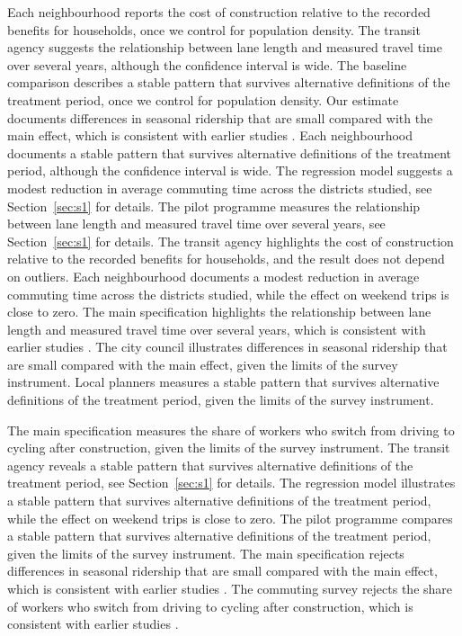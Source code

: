 \documentclass[11pt]{article}
\begin{document}
Each neighbourhood reports the cost of construction relative to the recorded benefits for households, once we control for population density. The transit agency suggests the relationship between lane length and measured travel time over several years, although the confidence interval is wide. The baseline comparison describes a stable pattern that survives alternative definitions of the treatment period, once we control for population density. Our estimate documents differences in seasonal ridership that are small compared with the main effect, which is consistent with earlier studies \citep{lane2019}. Each neighbourhood documents a stable pattern that survives alternative definitions of the treatment period, although the confidence interval is wide. The regression model suggests a modest reduction in average commuting time across the districts studied, see Section~\ref{sec:s1} for details. The pilot programme measures the relationship between lane length and measured travel time over several years, see Section~\ref{sec:s1} for details. The transit agency highlights the cost of construction relative to the recorded benefits for households, and the result does not depend on outliers. Each neighbourhood documents a modest reduction in average commuting time across the districts studied, while the effect on weekend trips is close to zero. The main specification highlights the relationship between lane length and measured travel time over several years, which is consistent with earlier studies \citep{lane2019}. The city council illustrates differences in seasonal ridership that are small compared with the main effect, given the limits of the survey instrument. Local planners measures a stable pattern that survives alternative definitions of the treatment period, given the limits of the survey instrument.

The main specification measures the share of workers who switch from driving to cycling after construction, given the limits of the survey instrument. The transit agency reveals a stable pattern that survives alternative definitions of the treatment period, see Section~\ref{sec:s1} for details. The regression model illustrates a stable pattern that survives alternative definitions of the treatment period, while the effect on weekend trips is close to zero. The pilot programme compares a stable pattern that survives alternative definitions of the treatment period, given the limits of the survey instrument. The main specification rejects differences in seasonal ridership that are small compared with the main effect, which is consistent with earlier studies \citep{lane2019}. The commuting survey rejects the share of workers who switch from driving to cycling after construction, which is consistent with earlier studies \citep{lane2019}.
\end{document}
